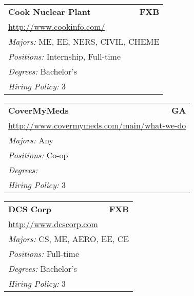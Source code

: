 \documentclass[twoside]{article}
\begin{document}
\begin{center}
\begin{multicols}{3}
\begin{FlushLeft}
\begin{minipage}{.9\columnwidth}
\end{minipage}
 
\begin{minipage}{.9\columnwidth}\begin{tabularx}{.95\columnwidth}{Xr}
                 {\Large\bf Cook Nuclear Plant} & {\Large\bf FXB}\\
    \multicolumn{2}{p{.95\columnwidth}}{\url{http://www.cookinfo.com/}}\\
    \multicolumn{2}{p{.95\columnwidth}}{\emph{Majors:} ME, EE, NERS, CIVIL, CHEME}\\
    \multicolumn{2}{p{.95\columnwidth}}{\emph{Positions:} Internship, Full-time}\\
    \multicolumn{2}{p{.95\columnwidth}}{\emph{Degrees:} Bachelor's}\\
    \multicolumn{2}{p{.95\columnwidth}}{\emph{Hiring Policy:} 3}\\
    \end{tabularx}
    
\end{minipage}
 
\begin{minipage}{.9\columnwidth}\begin{tabularx}{.95\columnwidth}{Xr}
                 {\Large\bf CoverMyMeds} & {\Large\bf GA}\\
    \multicolumn{2}{p{.95\columnwidth}}{\url{http://www.covermymeds.com/main/what-we-do}}\\
    \multicolumn{2}{p{.95\columnwidth}}{\emph{Majors:} Any}\\
    \multicolumn{2}{p{.95\columnwidth}}{\emph{Positions:} Co-op}\\
    \multicolumn{2}{p{.95\columnwidth}}{\emph{Degrees:} }\\
    \multicolumn{2}{p{.95\columnwidth}}{\emph{Hiring Policy:} 3}\\
    \end{tabularx}
    
\end{minipage}
 
\begin{minipage}{.9\columnwidth}\begin{tabularx}{.95\columnwidth}{Xr}
                 {\Large\bf DCS Corp} & {\Large\bf FXB}\\
    \multicolumn{2}{p{.95\columnwidth}}{\url{http://www.dcscorp.com}}\\
    \multicolumn{2}{p{.95\columnwidth}}{\emph{Majors:} CS, ME, AERO, EE, CE}\\
    \multicolumn{2}{p{.95\columnwidth}}{\emph{Positions:} Full-time}\\
    \multicolumn{2}{p{.95\columnwidth}}{\emph{Degrees:} Bachelor's}\\
    \multicolumn{2}{p{.95\columnwidth}}{\emph{Hiring Policy:} 3}\\
    \end{tabularx}
    

\end{minipage}
\end{FlushLeft}
\end{multicols}
\end{center}
\end{document}

